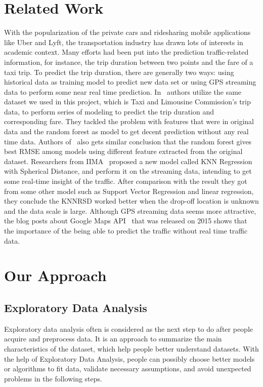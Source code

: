 \section{Related Work}
With the popularization of the private cars and ridesharing mobile applications like Uber and Lyft, the transportation industry has drawn lots of interests in academic context. Many efforts had been put into the prediction traffic-related information, for instance, the trip duration between two points and the fare of a taxi trip. To predict the trip duration, there are generally two ways: using historical data as training model to predict new data set or using GPS streaming data to perform some near real time prediction. 
In~\cite{antoniades2016fare} authors utilize the same dataset we used in this project, which is Taxi and Limousine Commission’s trip data, to perform series of modeling to predict the trip duration and corresponding fare. They tackled the problem with features that were in original data and the random forest as model to get decent prediction without any real time data. Authors of~\cite{lee2015taxi} also gets similar conclusion that the random forest gives best RMSE among models using different feature extracted from the original dataset. Researchers from IIMA~\cite{laha2017travel} proposed a new model called KNN Regression with Spherical Distance, and perform it on the streaming data, intending to get some real-time insight of the traffic. After comparison with the result they got from some other model such as Support Vector Regression and linear regression, they conclude the KNNRSD worked better when the drop-off location is unknown and the data scale is large. Although GPS streaming data seems more attractive, the blog posts about Google Maps API~\cite{weber_2015} that was released on 2015 shows that the importance of the being able to predict the traffic without real time traffic data.   



\section{Our Approach}

\subsection{Exploratory Data Analysis}
Exploratory data analysis often is considered as the next step to do after people acquire and preprocess data. It is an approach to summarize the main characteristics of the dataset, which help people better understand datasets. With the help of Exploratory Data Analysis, people can possibly choose better models or algorithms to fit data, validate necessary assumptions, and avoid unexpected problems in the following steps.

